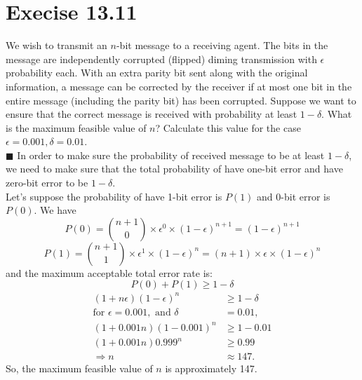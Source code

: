 \documentclass{article}
\newcommand{\solution}[1]{~\\ $\blacksquare$ \sffamily\upshape\selectfont #1
\normalfont ~\\~ }
\begin{document}
\section{Execise 13.11}
We wish to transmit an $n$-bit message to a receiving agent. The bits
in the message are independently corrupted (flipped) diming
transmission with $\epsilon$ probability each. With an extra parity
bit sent along with the original information, a message can be
corrected by the receiver if at most one bit in the entire message
(including the parity bit) has been corrupted. Suppose we want to
ensure that the correct message is received with probability at least
$1-\delta$. What is the maximum feasible value of $n$? Calculate this
value for the case $\epsilon = 0.001, \delta = 0.01$.
\solution{
  In order to make sure the probability of received message to be at
  least $1-\delta$, we need to make sure that the total probability of
  have one-bit error and have zero-bit error to be $1-\delta$. \\
  Let's suppose the probability of have 1-bit error is $P(1)$ and 0-bit
  error is $P(0)$. We have 
  \[ P(0) = {n+1 \choose 0}\times \epsilon ^{0}\times (1-\epsilon)^{n+1}
  = (1-\epsilon)^{n+1} \]
  \[ P(1) = {n+1 \choose 1}\times \epsilon ^{1}\times (1-\epsilon)^{n}
  = (n+1)\times \epsilon \times (1-\epsilon)^n \]
  and the maximum acceptable total error rate is: 
  \[ P(0) + P(1) \geq 1 - \delta \]
\begin{align*}
  (1+n\epsilon)(1-\epsilon)^n & \geq 1-\delta \\
  \mbox{for } \epsilon = 0.001, \mbox{ and } \delta & = 0.01,  \\
  (1+0.001n)(1-0.001)^n & \geq 1-0.01 \\
  (1+0.001n)0.999^n & \geq 0.99  \\
  \Rightarrow n & \approx 147. 
\end{align*}
  So, the maximum feasible value of $n$ is approximately 147. 
}
\end{document}
